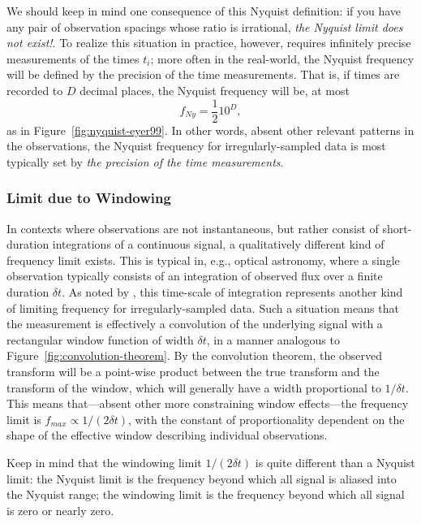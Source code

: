 \documentclass[preprint]{aastex}
\newcommand{\fig}[1]{Figure~\ref{fig:#1}}
\newcommand{\eqlabel}[1]{\label{eq:#1}}
\begin{document}
We should keep in mind one consequence of this Nyquist definition:
if you have any pair of observation spacings
whose ratio is irrational, {\it the Nyquist limit does not exist!}.
To realize this situation in practice, however, 
requires infinitely precise measurements of the
times $t_i$; more often in the real-world, the Nyquist frequency will be
defined by the precision of the time measurements.
That is, if times are recorded to $D$ decimal places, the Nyquist frequency
will be, at most
\begin{equation}
  f_{Ny} = \frac{1}{2} 10^D,
  \eqlabel{nonuniform-nyquist}
\end{equation}
as in \fig{nyquist-eyer99}.
In other words, absent other relevant patterns in the observations,
the Nyquist frequency for irregularly-sampled data is most
typically set by {\it the precision of the time measurements}.

\subsubsection{Limit due to Windowing}

In contexts where observations are not instantaneous, but rather consist of
short-duration integrations of a continuous signal, a qualitatively different
kind of frequency limit exists.
This is typical in, e.g., optical astronomy, where a single observation typically consists of an integration of observed flux over a finite duration $\delta t$.
As noted by \citet{ICVG2014}, this time-scale of integration represents another
kind of limiting frequency for irregularly-sampled data.
Such a situation means that the measurement is effectively a convolution of
the underlying signal with a rectangular window function of width $\delta t$,
in a manner analogous to \fig{convolution-theorem}.
By the convolution theorem, the observed transform will be a point-wise
product between the true transform and the transform of the window, which
will generally have a width proportional to $1/\delta t$.
This means that---absent other more constraining window effects---the
frequency limit is $f_{max} \propto 1/(2\delta t)$, with the constant of
proportionality dependent on the shape of the effective window describing
individual observations.

Keep in mind that the windowing limit $1/(2\delta t)$ is quite different than a
Nyquist limit: the Nyquist limit is the frequency beyond which all signal
is aliased into the Nyquist range; the windowing limit is the frequency
beyond which all signal is zero or nearly zero.
\end{document}

